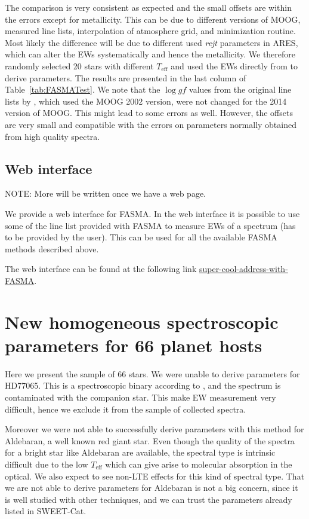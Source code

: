 \documentclass{aa}
\begin{document}
The comparison is very consistent as expected and the small offsets are within
the errors except for metallicity. This can be due to different versions of
MOOG, measured line lists, interpolation of atmosphere grid, and minimization
routine. Most likely the difference will be due to different used \emph{rejt}
parameters in ARES, which can alter the EWs systematically and hence the
metallicity. We therefore randomly selected 20 stars with different
$T_\mathrm{eff}$ and used the EWs directly from \citet{Sousa2011} to derive
parameters. The results are presented in the last column of
Table~\ref{tab:FASMATest}. We note that the $\log gf$ values from the original
line lists by \citet{Sousa2011}, which used the MOOG 2002 version, were not
changed for the 2014 version of MOOG. This might lead to some errors as well.
However, the offsets are very small and compatible with the errors on parameters
normally obtained from high quality spectra.


\subsection{Web interface}
\label{sub:Web interface}
NOTE: More will be written once we have a web page.

We provide a web interface for FASMA. In the web interface it is possible to use
some of the line list provided with FASMA to measure EWs of a spectrum (has to
be provided by the user). This can be used for all the available FASMA methods
described above.

The web interface can be found at the following link
\url{super-cool-address-with-FASMA}.



\section{New homogeneous spectroscopic parameters for 66 planet hosts}
\label{sec:results}
Here we present the sample of 66 stars. We were unable to derive parameters for
HD77065. This is a spectroscopic binary according to \cite{Pourbaix2004}, and
the spectrum is contaminated with the companion star. This make EW measurement
very difficult, hence we exclude it from the sample of collected spectra.

Moreover we were not able to successfully derive parameters with this method for
Aldebaran, a well known red giant star. Even though the quality of the spectra
for a bright star like Aldebaran are available, the spectral type is intrinsic
difficult due to the low $T_\mathrm{eff}$ which can give arise to molecular
absorption in the optical. We also expect to see non-LTE effects for this kind
of spectral type. That we are not able to derive parameters for Aldebaran is not
a big concern, since it is well studied with other techniques, and we can trust
the parameters already listed in SWEET-Cat.
\end{document}
